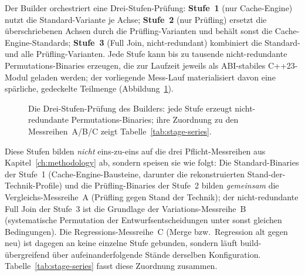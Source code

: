 Der Builder orchestriert eine Drei-Stufen-Prüfung: \textbf{Stufe~1} (nur Cache-Engine) nutzt die
Standard-Variante je Achse; \textbf{Stufe~2} (nur Prüfling) ersetzt die überschriebenen Achsen
durch die Prüfling-Varianten und behält sonst die Cache-Engine-Standards; \textbf{Stufe~3} (Full
Join, nicht-redundant) kombiniert die Standard- und alle Prüfling-Varianten. Jede Stufe kann bis zu
tausende nicht-redundante Permutations-Binaries erzeugen, die zur Laufzeit jeweils als ABI-stabiles
C++23-Modul geladen werden; der vorliegende Mess-Lauf materialisiert davon eine spärliche, gedeckelte
Teilmenge (Abbildung~\ref{fig:three-stage}).

\begin{figure}[!htbp]
  \centering
  \caption{Die Drei-Stufen-Prüfung des Builders: jede Stufe erzeugt nicht-redundante
  Permutations-Binaries; ihre Zuordnung zu den Messreihen~A/B/C zeigt
  Tabelle~\ref{tab:stage-series}.}\label{fig:three-stage}
\end{figure}

Diese Stufen bilden \emph{nicht} eins-zu-eins auf die drei Pflicht-Messreihen aus
Kapitel~\ref{ch:methodology} ab, sondern speisen sie wie folgt: Die Standard-Binaries der Stufe~1
(Cache-Engine-Bausteine, darunter die rekonstruierten Stand-der-Technik-Profile) und die
Prüfling-Binaries der Stufe~2 bilden \emph{gemeinsam} die Vergleichs-Messreihe~A (Prüfling gegen
Stand der Technik); der nicht-redundante Full Join der Stufe~3 ist die Grundlage der
Variations-Messreihe~B (systematische Permutation der Entwurfsentscheidungen unter sonst gleichen
Bedingungen). Die Regressions-Messreihe~C (Merge bzw.\ Regression alt gegen neu) ist dagegen an
keine einzelne Stufe gebunden, sondern läuft build-übergreifend über aufeinanderfolgende Stände
derselben Konfiguration. Tabelle~\ref{tab:stage-series} fasst diese Zuordnung zusammen.

